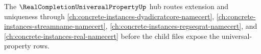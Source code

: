 The $\RealCompletionUniversalPropertyUp$ hub routes extension and uniqueness through \autoref{ch:concrete-instances-dyadicratcore-namecert}, \autoref{ch:concrete-instances-streamname-namecert}, \autoref{ch:concrete-instances-regseqrat-namecert}, and \autoref{ch:concrete-instances-real-namecert} before the child files expose the universal-property rows.






